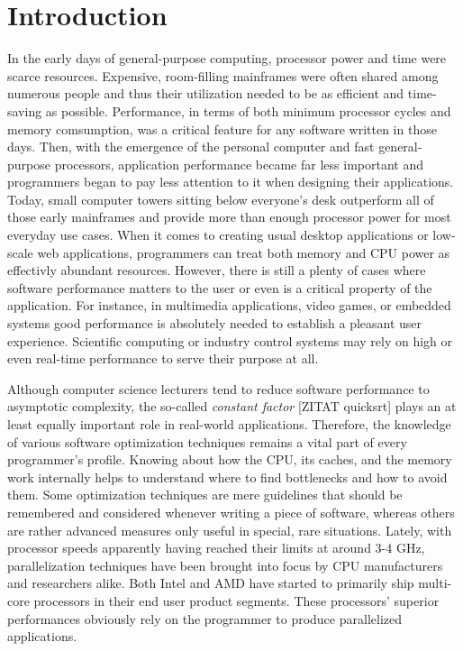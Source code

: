 \section{Introduction}
In the early days of general-purpose computing, processor power and time were scarce resources. Expensive, room-filling mainframes were often shared among numerous people and thus their utilization needed to be as efficient and time-saving as possible.   Performance, in terms of both minimum processor cycles and memory comsumption, was a critical feature for any software written in those days. Then, with the emergence of the personal computer and fast general-purpose processors, application performance became far less important and programmers began to pay less attention to it when designing their applications. Today, small computer towers sitting below everyone's desk outperform all of those early mainframes and provide more than enough processor power for most everyday use cases. When it comes to creating usual desktop applications or low-scale web applications, programmers can treat both memory and CPU power as effectivly abundant resources. However, there is still a plenty of cases where software performance matters to the user or even is a critical property of the application. For instance, in multimedia applications, video games, or embedded systems good performance is absolutely needed to establish a pleasant user experience. Scientific computing or industry control systems may rely on high or even real-time performance to serve their purpose at all.

Although computer science lecturers tend to reduce software performance to asymptotic complexity, the so-called \emph{constant factor} [ZITAT quicksrt] plays an at least equally important role in real-world applications. Therefore, the knowledge of various software optimization techniques remains a vital part of every programmer's profile. Knowing about how the CPU, its caches, and the memory work internally helps to understand where to find bottlenecks and how to avoid them. Some optimization techniques are mere guidelines that should be remembered and considered whenever writing a piece of software, whereas others are rather advanced measures only useful in special, rare situations. Lately, with processor speeds apparently having reached their limits at around 3-4 GHz, parallelization techniques have been brought into focus by CPU manufacturers and researchers alike. Both Intel and AMD have started to primarily ship multi-core processors in their end user product segments. These processors' superior performances obviously rely on the programmer to produce parallelized applications. 

